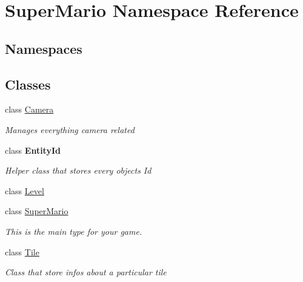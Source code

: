 \hypertarget{namespace_super_mario}{}\section{Super\+Mario Namespace Reference}
\label{namespace_super_mario}
\subsection*{Namespaces}
\begin{DoxyCompactItemize}
\end{DoxyCompactItemize}
\subsection*{Classes}
\begin{DoxyCompactItemize}
\item 
class \mbox{\hyperlink{class_super_mario_1_1_camera}{Camera}}
\begin{DoxyCompactList}\small\item\em Manages everything camera related \end{DoxyCompactList}\item 
class {\bfseries Entity\+Id}
\begin{DoxyCompactList}\small\item\em Helper class that stores every object\textquotesingle{}s Id \end{DoxyCompactList}\item 
class \mbox{\hyperlink{class_super_mario_1_1_level}{Level}}
\item 
class \mbox{\hyperlink{class_super_mario_1_1_super_mario}{Super\+Mario}}
\begin{DoxyCompactList}\small\item\em This is the main type for your game. \end{DoxyCompactList}\item 
class \mbox{\hyperlink{class_super_mario_1_1_tile}{Tile}}
\begin{DoxyCompactList}\small\item\em Class that store infos about a particular tile \end{DoxyCompactList}\end{DoxyCompactItemize}
